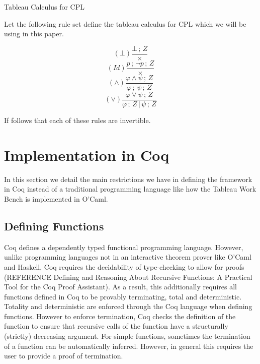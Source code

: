 \documentclass{llncs}
\begin{document}
\begin{definition}{Tableau Calculus for CPL}

Let the following rule set define the tableau calculus for CPL which we will be
using in this paper.

\begin{multicols}{4}
\noindent
\begin{equation*}
(\bot)\frac{\bot\,;\,Z}{\times}
\end{equation*}
\begin{equation*}
(Id)\frac{p\,;\,\neg p\,;\,Z}{\times}
\end{equation*}
\begin{equation*}
(\wedge)\frac{\varphi \wedge \psi\,;\,Z}{\varphi\,;\,\psi\,;\,Z}
\end{equation*}
\begin{equation*}
(\vee)\frac{\varphi \vee \psi\,;\,Z}{\varphi\,;\,Z\,|\,\psi\,;\,Z}
\end{equation*}
\end{multicols}

If follows that each of these rules are invertible.
\end{definition}

\section{Implementation in Coq}

In this section we detail the main restrictions we have in defining the
framework in Coq instead of a traditional programming language like how the
Tableau Work Bench is implemented in O'Caml.

\subsection{Defining Functions}

Coq defines a dependently typed functional programming language. However,
unlike programming languages not in an interactive theorem prover like O'Caml
and Haskell, Coq requires the decidability of type-checking to allow for proofs
(REFERENCE Defining and Reasoning About Recursive Functions: A Practical Tool
for the Coq Proof Assistant). As a result, this additionally requires all
functions defined in Coq to be provably terminating, total and deterministic.
Totality and deterministic are enforced through the Coq language when defining
functions. However to enforce termination, Coq checks the definition of the
function to ensure that recursive calls of the function have a structurally
(strictly) decreasing argument. For simple functions, sometimes the termination
of a function can be automatically inferred. However, in general this requires
the user to provide a proof of termination.
\end{document}
